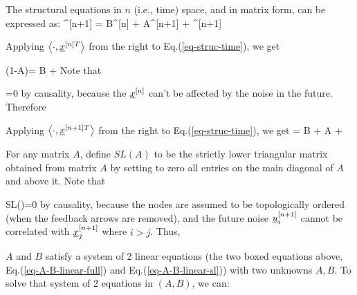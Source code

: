 The structural equations in $n$ (i.e., time) space,
and in matrix form, can be expressed as:
\beq
\rvx^{[n+1]} = B\rvx^{[n]} + A\rvx^{[n+1]}
+ \rvu^{[n+1]}
\label{eq-struc-time}
\eeq

Applying $\left\langle\cdot, {\underline{x}}^{[n]T} \right\rangle$
from the right to Eq.(\ref{eq-struc-time}), we get

\beq 
(1-A)=
B 
+ 
\eeq
Note that

\beq
{}=0
\eeq
by causality, 
because the ${\underline{x}}^{[n]}$
can't be affected by the noise in the future.
Therefore

\beq
{}
\label{eq-A-B-linear-full}
\eeq


Applying $\left\langle\cdot, {\underline{x}}^{[n+1]T} \right\rangle$
from the right to Eq.(\ref{eq-struc-time}), we get
\beq
{}
= B
 + A
+ 
\eeq

For any matrix $A$,
define $SL(A)$ 
to be the strictly lower triangular
matrix obtained from matrix $A$ by
setting to zero all entries 
on the main diagonal of $A$ and above it.
Note that

\beq 
SL()=0
\eeq
by causality,
because the nodes are assumed to be topologically ordered (when the feedback
arrows are removed),
and the future noise ${\underline{u}}^{[n+1]}_i$
cannot be
correlated with ${\underline{x}}^{[n+1]}_j$
where  $i>j$.
Thus,

\beq
{}
\label{eq-A-B-linear-sl}
\eeq

$A$ and $B$ satisfy a system of 2 linear equations (the two boxed
equations above, Eq.(\ref{eq-A-B-linear-full})
and Eq.(\ref{eq-A-B-linear-sl})) with two unknowns $A,B$.
To solve that system of 2 equations in $(A, B)$, we can:

